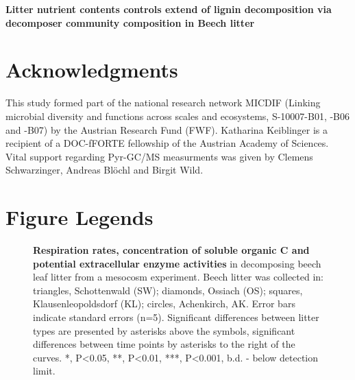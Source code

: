 \documentclass[10pt]{article}
\date{}
\begin{document}
\begin{flushleft}
{\Large
\textbf{Litter nutrient contents controls extend of lignin decomposition via decomposer community composition in Beech litter }
}
\\

\newpage


\linenumbers %
\newpage%





\section*{Acknowledgments}
This study formed part of the national research network MICDIF (Linking microbial diversity and functions across scales and ecosystems, S-10007-B01, -B06 and -B07) by the Austrian Research Fund (FWF). Katharina Keiblinger is a recipient of a DOC-fFORTE fellowship of the Austrian Academy of Sciences. Vital support regarding Pyr-GC/MS measurments was given by Clemens Schwarzinger, Andreas Bl\"{o}chl and Birgit Wild.



\newpage
\section*{Figure Legends}

\begin{figure}[!h]
\begin{center}
\end{center}
\caption{
{\bf Respiration rates, concentration of soluble organic C and potential extracellular enzyme activities} in decomposing beech leaf litter from a mesocosm experiment. Beech litter was collected in: triangles, Schottenwald (SW); diamonds, Ossiach (OS); squares, Klausenleopoldsdorf (KL); circles, Achenkirch, AK. Error bars indicate standard errors (n=5). Significant differences between litter types are presented by asterisks above the symbols, significant differences between time points by asterisks to the right of the curves. *, P\textless 0.05, **, P\textless 0.01, ***, P\textless 0.001, b.d. - below detection limit.}
\label{fig:enz}
\end{figure}


\end{flushleft}
\end{document}
